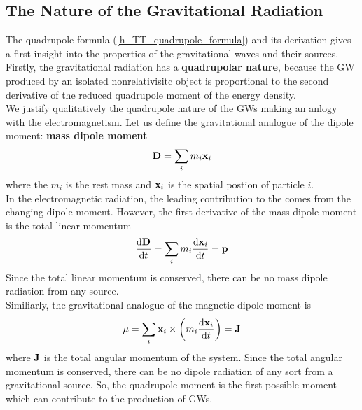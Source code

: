 \subsection{The Nature of the Gravitational Radiation}
The quadrupole formula (\ref{h_TT_quadrupole_formula}) and its derivation gives a  first insight into the properties of the gravitational waves and their sources.\\
Firstly, the gravitational radiation has a \textbf{quadrupolar nature}, because the GW produced by an isolated nonrelativisitc object is proportional to the second derivative of the reduced quadrupole moment of the energy density. \\
We justify qualitatively
the quadrupole nature of the GWs making an anlogy with the electromagnetism.
Let us define the gravitational analogue of the dipole moment: \textbf{mass dipole moment}
\begin{equation}
\label{mass_dipole_moment}
\vb{D} = \sum _{i} m_{i} \vb{x}_i
\end{equation}
where the $m_i$ is the rest mass and $\vb{x}_{i}$ is the spatial postion of particle $i$.\\
In the electromagnetic radiation, the leading contribution to the  comes from the changing dipole moment. 
However, the first derivative of the mass dipole moment is the total linear momentum
\[
\dv{\vb{D}}{t} = \sum _{i} m_i \dv{\vb{x}_i}{t} = \vb{p}
\]
Since the total linear momentum is conserved, there can be no mass dipole radiation from any source.\\
Similiarly, the gravitational analogue of the magnetic dipole moment is 
\[
\vb{\mu} = \sum_{i} \vb{x}_i \times \qty(m_i \dv{\vb{x}_i}{t}) =\vb{J}
\]
where $\vb{J}$ is the total angular momentum of the system. 
Since the total angular momentum is conserved, there can be no dipole radiation of any sort from a gravitational source.
So, the quadrupole moment is the first possible moment which can contribute to the production of GWs.\\


